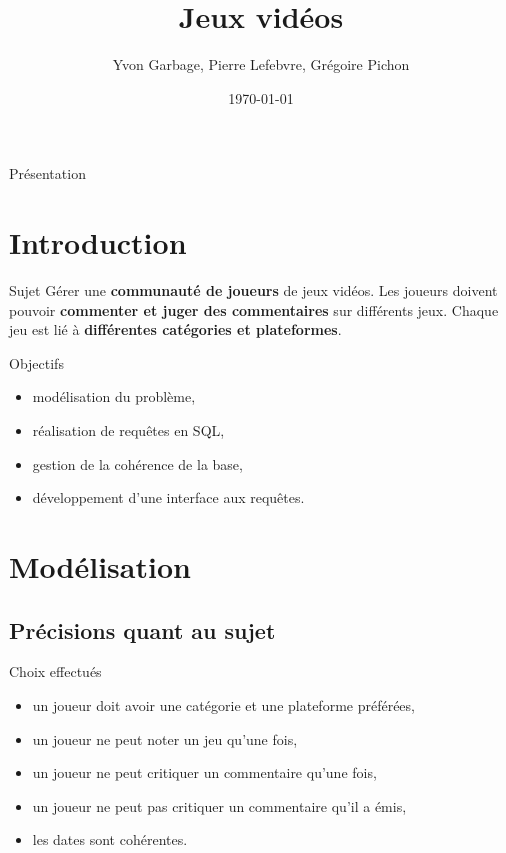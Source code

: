 \documentclass{beamer}
\title[Projet de SGBD]{Jeux vidéos}
\author[ENSEIRB-MATMECA]{Yvon Garbage, Pierre Lefebvre, Grégoire Pichon}
\institute[S7]{ENSEIRB-MATMECA}
\date{\today}
\begin{document}
\setlength{\unitlength}{1cm}

\begin{frame}{Présentation}

\titlepage

\end{frame}

\section*{Introduction}
\begin{frame}
\begin{block}{Sujet}
Gérer une \textbf{communauté de joueurs} de jeux vidéos. Les joueurs doivent pouvoir \textbf{commenter et juger des commentaires} sur différents jeux. Chaque jeu est lié à \textbf{différentes catégories et plateformes}.

\end{block}

\begin{block}{Objectifs}
\begin{center}
\begin{itemize}
  \item{modélisation du problème,}
  \item{réalisation de requêtes en SQL,}
  \item{gestion de la cohérence de la base,}
  \item{développement d'une interface aux requêtes.}
\end{itemize}
\end{center}
\end{block}
\end{frame}

\section{Modélisation}
\subsection{Précisions quant au sujet}
\begin{frame}
\begin{block}{Choix effectués}
\begin{center}
\begin{itemize}
\item un joueur doit avoir une catégorie et une plateforme préférées,
\item un joueur ne peut noter un jeu qu'une fois,
\item un joueur ne peut critiquer un commentaire qu'une fois,
\item un joueur ne peut pas critiquer un commentaire qu'il a émis,
\item les dates sont cohérentes.
\end{itemize}
\end{center}
\end{block}
\end{frame}
\end{document}
